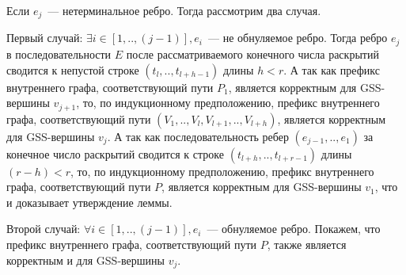 Если $e_{j}$~--- нетерминальное ребро. Тогда рассмотрим два случая.

Первый случай: $\exists i \in [1,..,(j-1)], e_{i}$~--- не обнуляемое ребро. Тогда ребро $e_{j}$ в последовательности $E$ после рассматриваемого конечного числа раскрытий сводится к непустой строке $(t_{l},..,t_{l+h-1})$ длины $h < r$. А так как префикс внутреннего графа, соответствующий пути $P_{1}$, является корректным для GSS-вершины $v_{j+1}$, то, по индукционному предположению, префикс внутреннего графа, соответствующий пути $(V_{1},..,V_{l},V_{l+1},..,V_{l+h})$, является корректным для GSS-вершины $v_{j}$. А так как последовательность ребер $(e_{j-1},..,e_{1})$ за конечное число раскрытий сводится к строке $(t_{l+h},..,t_{l+r-1})$ длины $(r - h) < r$, то, по индукционному предположению, префикс внутреннего графа, соответствующий пути $P$, является корректным для GSS-вершины $v_{1}$, что и доказывает утверждение леммы.

Второй случай: $\forall i \in [1,..,(j-1)], e_{i}$~--- обнуляемое ребро. Покажем, что префикс внутреннего графа, соответствующий пути $P$, также является корректным и для GSS-вершины $v_{j}$.

